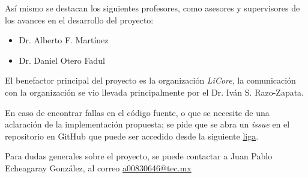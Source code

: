 \documentclass{article}
\begin{document}
        Así mismo se destacan los siguientes profesores, como asesores y supervisores de los avances en el desarrollo del proyecto:
        \begin{itemize}[noitemsep]
            \item Dr. Alberto F. Martínez
            \item Dr. Daniel Otero Fadul
        \end{itemize}

        El benefactor principal del proyecto es la organización \textit{LiCore}, la comunicación con la organización se vio llevada principalmente por el Dr. Iván S. Razo-Zapata.

        En caso de encontrar fallas en el código fuente, o que se necesite de una aclaración de la implementación propuesta; se pide que se abra un \textit{issue} en el repositorio en GitHub que puede ser accedido desde la siguiente \href{https://github.com/JuanEcheagaray75/licore-pki}{liga}.

        Para dudas generales sobre el proyecto, se puede contactar a Juan Pablo Echeagaray González, al correo \href{mailto:a00830646@tec.mx}{a00830646@tec.mx}
\end{document}
